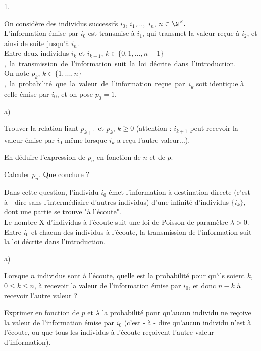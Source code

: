 \documentclass[11pt]{article}%
\begin{document}
\begin{noliste}{1.}
 \setlength{\itemsep}{4mm}
\item On considère des individus successifs $i_{0}$, $i_{1}$,...,\
$i_{n}
$, $n\in \N^{\times }.$\\
L'information émise par $i_{0}$ est transmise à $i_{1}$, qui transmet
la
valeur reçue à $i_{2}$, et ainsi de suite jusqu'à $i_{n}$.\\
Entre deux individus $i_{k}$ et $i_{k + 1}$, $k\in \{0,1,...,n - 1\}$,\
la\
transmission\ de\ l'information\ suit\ la\ loi\ décrite\ dans\
l'introduction.\\
On note $p_{k}$, $k\in \{1,...,n\}$,\ la\ probabilité\ que\ la\ valeur\
de\
l'information\ reçue\ par\ $i_{k}$ soit identique à celle émise par
$i_{0}$, et on pose $p_{0} = 1$.

\begin{noliste}{a)}
 \setlength{\itemsep}{2mm}
\item Trouver la relation liant $p_{k + 1}$ et $p_{k}$, $k\geq 0$
(attention : $i_{k + 1}$ peut recevoir la valeur émise par $i_{0}$ même
lorsque $i_{k}$ a reçu l'autre valeur...).

\item En déduire l'expression de $p_{n}$ en fonction de $n$ et de $p$.

\item Calculer $p_{n}$. Que conclure ?
\end{noliste}

\item Dans cette question, l'individu $i_{0}$ émet l'information à
destination directe (c'est - à - dire sans l'intermédiaire d'autres
individus)
d'une infinité d'individus $\{i_{k}\}$, dont une partie se trouve "à
l'écoute".\\
Le nombre X d'individus à l'écoute suit une loi de Poisson de paramètre
$\lambda >0$.\\
Entre $i_{0}$ et chacun des individus à l'écoute, la transmission de
l'information suit la loi décrite dans l'introduction.

\begin{noliste}{a)}
 \setlength{\itemsep}{2mm}
\item Lorsque $n$ individus sont à l'écoute, quelle est la probabilité
pour
qu'ils soient $k$, $0\leq k\leq n$, à recevoir la valeur de
l'information émise par $i_{0}$, et donc $n - k$ à recevoir l'autre
valeur ?

\item Exprimer en fonction de $p$ et $\lambda $ la probabilité pour
qu'aucun
individu ne reçoive la valeur de l'information émise par $i_{0}$ (c'est
- à - dire qu'aucun individu n'est à l'écoute, ou que tous les
individus à l'écoute reçoivent l'autre valeur d'information).


\end{noliste}
\end{noliste}
\end{document}
